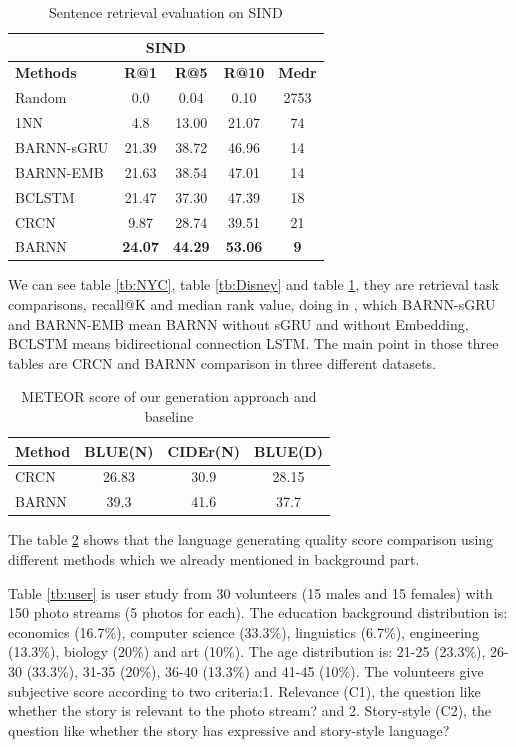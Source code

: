 \documentclass[11pt]{article}
\begin{document}
\begin{table}[h]
\small
\centering
\begin{tabular}{l|c|c|c|c}
\hline 
\multicolumn{5}{c}{SIND} \\
\hline
\bf Methods & \bf R@1 & \bf R@5 & \bf R@10 & \bf Medr \\ 
\hline
Random &0.0 &0.04 &0.10 &2753 \\
1NN &4.8 &13.00 &21.07 &74 \\
BARNN-sGRU &21.39 &38.72 &46.96 &14 \\
BARNN-EMB &21.63 &38.54 &47.01 &14 \\
BCLSTM &21.47 &37.30 &47.39 &18 \\
CRCN &9.87 & 28.74 &39.51 &21 \\
\hline
BARNN & \bf 24.07 & \bf 44.29 & \bf 53.06 & \bf 9 \\
\hline
\end{tabular}
\caption{\label{tb:SIND} Sentence retrieval evaluation on SIND \cite{liu2017let}}
\end{table}

We can see table \ref{tb:NYC}, table \ref{tb:Disney} and table \ref{tb:SIND}, they are retrieval task comparisons, recall@K and median rank value, doing in \cite{liu2017let}, which BARNN-sGRU and BARNN-EMB mean BARNN without sGRU and without Embedding, BCLSTM means bidirectional connection LSTM. The main point in those three tables are CRCN and BARNN comparison in three different datasets. 

\begin{table}[h]
\small
\centering
\begin{tabular}{l|c|c|c}
\hline 
Method &BLUE(N) &CIDEr(N) &BLUE(D)  \\
\hline
CRCN &26.83 &30.9 &28.15  \\
BARNN &39.3 &41.6 &37.7  \\
\hline
\end{tabular}
\caption{\label{tb:METEOR} METEOR score of our generation approach and baseline \cite{liu2017let}}
\end{table}

The table \ref{tb:METEOR} shows that the language generating quality score comparison using different methods which we already mentioned in background part.

Table \ref{tb:user} is user study from 30 volunteers (15 males and 15 females) with 150 photo streams (5 photos for each).  The education background distribution is: economics (16.7\%), computer science
(33.3\%), linguistics (6.7\%), engineering (13.3\%), biology
(20\%) and art (10\%). The age distribution is: 21-25
(23.3\%), 26-30 (33.3\%), 31-35 (20\%), 36-40 (13.3\%) and
41-45 (10\%). The volunteers give subjective score according to two criteria:1. Relevance (C1), the question like  whether the story is relevant to the photo stream? and 2. Story-style (C2), the question like whether the story has expressive and story-style language?
\end{document}
